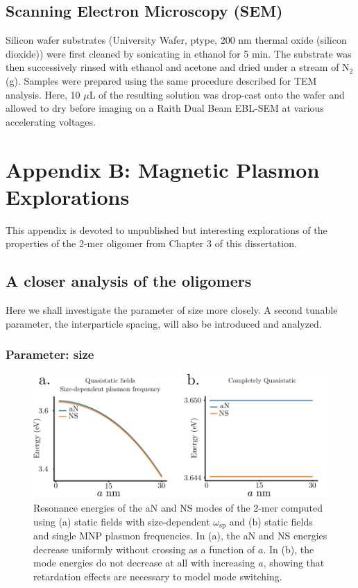 \documentclass [11pt, proquest] {uwthesis}[2016/11/22]
\begin{document}
\section{Scanning Electron Microscopy (SEM)}

Silicon wafer substrates (University Wafer, ptype, 200 nm thermal oxide (silicon dioxide)) were first cleaned by sonicating in ethanol for 5 min. The substrate was then successively rinsed with ethanol and acetone and dried under a stream of N$_2$(g). Samples were prepared using the same procedure described for TEM analysis. Here, 10 $\mu$L of the resulting solution was drop-cast onto the wafer and allowed to dry before imaging on a Raith Dual Beam EBL-SEM at various accelerating voltages.


\chapter{Appendix B: Magnetic Plasmon Explorations}

This appendix is devoted to unpublished but interesting explorations of the properties of the 2-mer oligomer from Chapter 3 of this dissertation.

\section{A closer analysis of the oligomers}

Here we shall investigate the parameter of size more closely. A second tunable parameter, the interparticle spacing, will also be introduced and analyzed.

\subsection{Parameter: size}

\begin{figure}
\begin{centering}
\includegraphics{qs_limit.pdf}
\caption{Resonance energies of the aN and NS modes of the 2-mer computed using (a) static fields with size-dependent $\omega_{\textrm{sp}}$ and (b) static fields and single MNP plasmon frequencies. In (a), the aN and NS energies decrease uniformly without crossing as a function of $a$. In (b), the mode energies do not decrease at all with increasing $a$, showing that retardation effects are necessary to model mode switching.}
\label{qs_limit}
\end{centering}
\end{figure}
\end{document}
